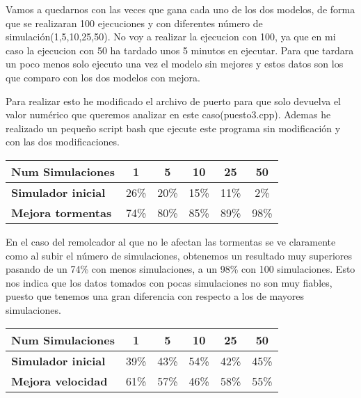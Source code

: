 \documentclass[]{article}
\begin{document}
Vamos a quedarnos con las veces que gana cada uno de los dos modelos, de forma que se realizaran 100 ejecuciones y con diferentes número de simulación(1,5,10,25,50).
No voy a realizar la ejecucion con 100, ya que en mi caso la ejecucion con 50 ha tardado unos 5 minutos en ejecutar. Para que tardara un poco menos solo ejecuto una vez el modelo sin mejores y estos datos son los que comparo con los dos modelos con mejora. 

Para realizar esto he modificado el archivo de puerto para que solo devuelva el valor numérico que queremos analizar en este caso(puesto3.cpp). Ademas he realizado un pequeño script bash que ejecute este programa sin modificación y con las dos modificaciones. 
\begin{table}[H]
	\begin{center}
		\begin{tabularx}{0.75\textwidth}{|X|c|c|c|c|c|}
			\hline
			\textbf{Num Simulaciones} &  \textbf{1} & \textbf{5} &\textbf{10} & \textbf{25} & \textbf{50}\\
			\hline \hline
			\textbf{Simulador inicial}&26\%  & 20\% & 15\% & 11\% & 2\% \\ \hline
			\textbf{Mejora tormentas}& 74\%& 80\%& 85\% & 89\% &  98\%\\ \hline
			
		\end{tabularx}
		
	\end{center}
\end{table}
En el caso del remolcador al que no le afectan las tormentas se ve claramente como al subir el número de simulaciones, obtenemos un resultado muy superiores pasando de un 74\% con menos simulaciones, a un 98\% con 100 simulaciones. Esto nos indica que los datos tomados con pocas simulaciones no son muy fiables, puesto que tenemos una gran diferencia con respecto a los de mayores simulaciones.

\begin{table}[H]
	\begin{center}
		\begin{tabularx}{0.75\textwidth}{|X|c|c|c|c|c|}
			\hline
			\textbf{Num Simulaciones} &  \textbf{1} & \textbf{5} &\textbf{10} & \textbf{25} & \textbf{50}\\
			\hline \hline
			\textbf{Simulador inicial}& 39\% & 43\% & 54\% &42\%& 45\% \\ \hline
			\textbf{Mejora velocidad}&61\% & 57\% & 46\% & 58\% & 55\% \\ \hline
			
		\end{tabularx}
		
	\end{center}
\end{table}
\end{document}
